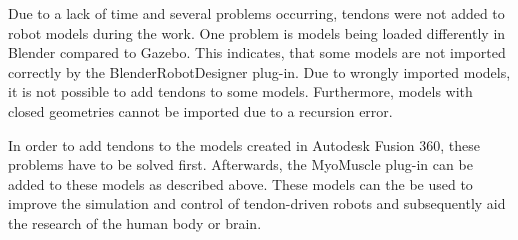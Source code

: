 
Due to a lack of time and several problems occurring, tendons were not added to robot models during the work. One problem is models being loaded differently in Blender compared to Gazebo. This indicates, that some models are not imported correctly by the BlenderRobotDesigner plug-in. Due to wrongly imported models, it is not possible to add tendons to some models. Furthermore, models with closed geometries cannot be imported due to a recursion error.

In order to add tendons to the models created in Autodesk Fusion 360, these problems have to be solved first. Afterwards, the MyoMuscle plug-in can be added to these models as described above. These models can the be used to improve the simulation and control of tendon-driven robots and subsequently aid the research of the human body or brain.